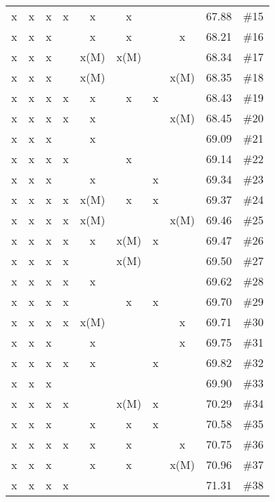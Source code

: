 \begin{longtable}{|c|c|c|c|c|c|c|c|c|c|}
 x    & x    & x    & x    & x    & x    &      &      & 67.88 & \#15 \\
 x    & x    & x    &      & x    & x    &      & x    & 68.21 & \#16 \\
 x    & x    & x    &      & x(M) & x(M) &      &      & 68.34 & \#17 \\
 x    & x    & x    &      & x(M) &      &      & x(M) & 68.35 & \#18 \\
 x    & x    & x    & x    & x    & x    & x    &      & 68.43 & \#19 \\
 x    & x    & x    & x    & x    &      &      & x(M) & 68.45 & \#20 \\
 x    & x    & x    &      & x    &      &      &      & 69.09 & \#21 \\
 x    & x    & x    & x    &      & x    &      &      & 69.14 & \#22 \\
 x    & x    & x    &      & x    &      & x    &      & 69.34 & \#23 \\
 x    & x    & x    & x    & x(M) & x    & x    &      & 69.37 & \#24 \\
 x    & x    & x    & x    & x(M) &      &      & x(M) & 69.46 & \#25 \\
 x    & x    & x    & x    & x    & x(M) & x    &      & 69.47 & \#26 \\
 x    & x    & x    & x    &      & x(M) &      &      & 69.50 & \#27 \\
 x    & x    & x    & x    & x    &      &      &      & 69.62 & \#28 \\
 x    & x    & x    & x    &      & x    & x    &      & 69.70 & \#29 \\
 x    & x    & x    & x    & x(M) &      &      & x    & 69.71 & \#30 \\
 x    & x    & x    &      & x    &      &      & x    & 69.75 & \#31 \\
 x    & x    & x    & x    & x    &      & x    &      & 69.82 & \#32 \\
 x    & x    & x    &      &      &      &      &      & 69.90 & \#33 \\
 x    & x    & x    & x    &      & x(M) & x    &      & 70.29 & \#34 \\
 x    & x    & x    &      & x    & x    & x    &      & 70.58 & \#35 \\
 x    & x    & x    & x    & x    & x    &      & x    & 70.75 & \#36 \\
 x    & x    & x    &      & x    & x    &      & x(M) & 70.96 & \#37 \\
 x    & x    & x    & x    &      &      &      &      & 71.31 & \#38 \\

\end{longtable}
